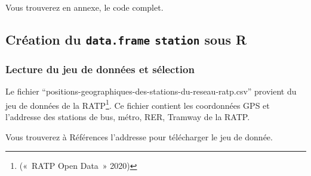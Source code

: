 \documentclass[french,]{article}
\begin{document}
Vous trouverez en annexe, le code complet.

\hypertarget{cruxe9ation-du-data.frame-station-sous-r}{%
\subsection{\texorpdfstring{Création du \texttt{data.frame}
\texttt{station} sous
R}{Création du data.frame station sous R}}\label{cruxe9ation-du-data.frame-station-sous-r}}

\hypertarget{lecture-du-jeu-de-donnuxe9es-et-suxe9lection}{%
\subsubsection{Lecture du jeu de données et
sélection}\label{lecture-du-jeu-de-donnuxe9es-et-suxe9lection}}

Le fichier ``positions-geographiques-des-stations-du-reseau-ratp.csv''
provient du jeu de données de la RATP\footnote{(«~RATP Open Data~» 2020)}.
Ce fichier contient les coordonnées GPS et l'addresse des stations de
bus, métro, RER, Tramway de la RATP.

Vous trouverez à Références l'addresse pour télécharger le jeu de
donnée.
\end{document}

